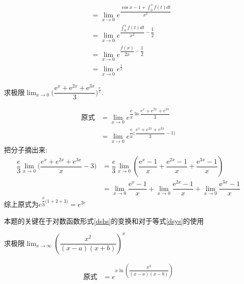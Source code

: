 \documentclass[8pt a4paper, oneside, UTF8]{ctexbook}
\begin{document}
\begin{sloppypar}
\begin{solution}
\begin{align*}
                      & =  \lim_{x\to 0}e^{\dfrac{\cos x-1+\int_0^xf(t)dt}{x^2}}                \\
                      & = \lim_{x\to 0}e^{\dfrac{\int_0^x f(t)dt}{x^2}-\dfrac{1}{2}}            \\
                      & = \lim_{x\to 0}e^{\dfrac{f(x)}{2x}-\dfrac{1}{2}}                        \\
                      & = \lim_{x\to 0}e^{\frac{1}{2}}
        \end{align*}
    \end{solution}
    \begin{problem}
    求极限$\lim_{x\to0}\Bigg(\dfrac{\mathrm{e}^x+\mathrm{e}^{2x}+\mathrm{e}^{3x}}3\Bigg)^{\frac{\mathrm{e}}{x}}.$
    \end{problem}
    \begin{solution}
        \begin{align*}
            \text{原式} & = \lim_{x\to0} e^{\dfrac{e}{x} \ln \dfrac{e^x+e^{2x}+e^{3x}}{3}}          \\
                      & = \lim_{x\to0} e^{\dfrac{e}{x}\Bigg(\dfrac{e^x+e^{2x}+e^{3x}}{3}-1\Bigg)}
        \end{align*}
        把分子摘出来:
        \begin{align*}
            \dfrac{e}{3} \lim_{x\to 0}\Bigg(\dfrac{e^x+e^{2x}+e^{3x}}{x} -3\Bigg) & =\dfrac{e}{3} \lim_{x\to 0} (\dfrac{\mathrm{e}^x-1}x+\dfrac{\mathrm{e}^{2x}-1}x+\dfrac{\mathrm{e}^{3x}-1}x)                 \\
                                                                                  & = \lim_{x\to0}\dfrac{\mathrm{e}^{x}-1}{x}+\lim_{x\to0}\dfrac{\mathrm{e}^{2x}-1}{x}+\lim_{x\to0}\dfrac{\mathrm{e}^{3x}-1}{x}
        \end{align*}
        综上原式为$e^{\dfrac{e}{3}\Bigg(1+2+3\Bigg)}=e^{2e}$
    \end{solution}
    \begin{note}
        本题的关键在于对数函数形式\ref{dshs}的变换和对于等式\ref{dsys}的使用
    \end{note}
    \begin{problem}
    求极限$\lim_{x\to\infty}\left(\dfrac{x^2}{(x-a)(x+b)}\right)^x$
    \end{problem}
    \begin{solution}
        \begin{align*}
            \text{原式} & =e^{x \ln \left(\dfrac{x^2}{(x-a)(x-b)}\right)} \\

\end{align*}
\end{solution}
\end{sloppypar}
\end{document}
